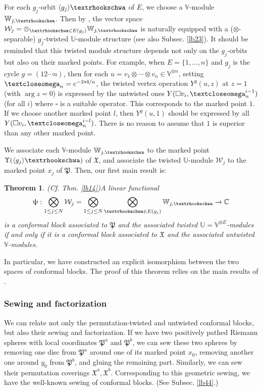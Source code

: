 \documentclass[12pt,a4paper,notitlepage]{article}
\theoremstyle{definition}
\theoremstyle{plain}
\newtheorem{Mthm}{Theorem}
\newcommand{\fk}{\mathfrak}
\newcommand{\mc}{\mathcal}
\newcommand{\bk}[1]{\langle {#1}\rangle}
\newcommand{\im}{\mathbf{i}}
\newcommand{\Vbb}{\mathbb V}
\newcommand{\Ubb}{\mathbb U}
\newcommand{\Wbb}{\mathbb W}
\newcommand{\Cbb}{\mathbb C}
\newcommand{\tipaomega}{\text{\textcloseomega}}
\newcommand{\tipae}{\text{\textrhookschwa}}
\numberwithin{equation}{subsection}
\begin{document}
For each $g_j$-orbit $\bk{g_j}\tipae$ of $E$, we choose a $\Vbb$-module $\Wbb_{j,\tipae}$. Then by \cite{BDM02}, the vector space $\mc W_j=\otimes_{\tipae\in E(g_j)}\Wbb_{j,\tipae}$ is naturally equipped with a ($\otimes$-separable) $g_j$-twisted $\Ubb$-module structure (see also Subsec. \ref{lb23}). It should be reminded that this twisted module structure depends not only on the $g_j$-orbits but also on their marked points. For example, when $E=\{1,\dots,n\}$ and $g_j$ is the cycle $g=(12\cdots n)$, then for each $u=v_1\otimes\cdots \otimes v_n\in\Vbb^{\otimes n}$, setting $\tipaomega_n=e^{-2\pi\im/n}$, the twisted vertex operation $Y^g(u,z)$ at $z=1$ (with $\arg z=0$) is expressed by the untwisted ones $Y(\square v_i,\tipaomega_n^{i-1})$ (for all $i$) where $\square$ is a suitable operator. This corresponds to the marked point $1$. If we choose another marked point $l$, then $Y^g(u,1)$ should be expressed by all  $Y(\square v_i,\tipaomega_n^{i-l})$. There is no reason to assume that $1$ is superior than any other marked point.

We associate each $\Vbb$-module $\Wbb_{j,\tipae}$ to the marked point $\Upsilon(\bk{g_j}\tipae)$ of $\fk X$, and associate the twisted $\Ubb$-module $\mc W_j$ to the marked point $x_j$ of $\fk P$. Then, our first main result is:
\begin{Mthm}(Cf. Thm. \ref{lb14})\label{lb69}
A linear functional
\begin{align*}
\uppsi:\bigotimes_{1\leq j\leq N}\mc W_j=\bigotimes_{1\leq j\leq N}\bigotimes_{\tipae\in E(g_j)}\Wbb_{j,\tipae}\rightarrow\Cbb
\end{align*}
is a conformal block associated to $\fk P$ and the associated twisted $\Ubb=\Vbb^{\otimes E}$-modules if and only if it is a conformal block associated to $\fk X$ and the associated untwisted $\Vbb$-modules.
\emph{}
\end{Mthm}
In particular, we have constructed an explicit isomorphism between the two spaces of conformal blocks. The proof of this theorem relies on the main results of \cite{Gui21b}.


\subsubsection*{Sewing and factorization}



We can relate not only  the permutation-twisted and untwisted conformal blocks, but also their sewing and factorization. If we have two positively pathed Riemann spheres with local coordinates $\fk P^a$ and $\fk P^b$, we can sew these two spheres by removing one disc from $\fk P^a$ around one of its marked point $x_0$, removing another one around $y_0$ from $\fk P^b$, and gluing the remaining part. Similarly, we can sew their permutation coverings $\fk X^a,\fk X^b$. Corresponding to this geometric sewing, we have the well-known sewing of conformal blocks. (See Subsec. \ref{lb44}.)
\end{document}
